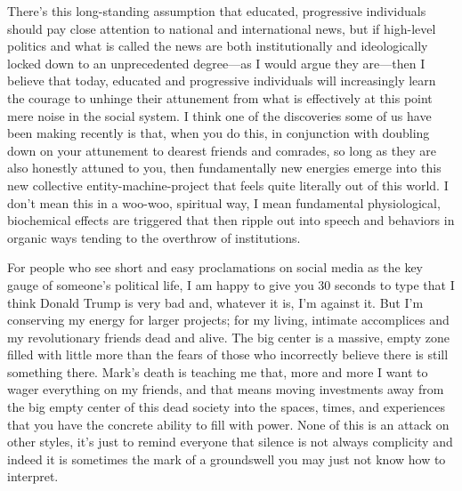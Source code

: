 \documentclass[a4paper,12pt,margin=.5in]{article}
\begin{document}
There's this long-standing assumption that educated, progressive
individuals should pay close attention to national and international
news, but if high-level politics and what is called the news are both
institutionally and ideologically locked down to an unprecedented
degree---as I would argue they are---then I believe that today, educated
and progressive individuals will increasingly learn the courage to
unhinge their attunement from what is effectively at this point mere
noise in the social system. I think one of the discoveries some of us
have been making recently is that, when you do this, in conjunction with
doubling down on your attunement to dearest friends and comrades, so
long as they are also honestly attuned to you, then fundamentally new
energies emerge into this new collective entity-machine-project that
feels quite literally out of this world. I don't mean this in a woo-woo,
spiritual way, I mean fundamental physiological, biochemical effects are
triggered that then ripple out into speech and behaviors in organic ways
tending to the overthrow of institutions.

For people who see short and easy proclamations on social media as the
key gauge of someone's political life, I am happy to give you 30 seconds
to type that I think Donald Trump is very bad and, whatever it is, I'm
against it. But I'm conserving my energy for larger projects; for my
living, intimate accomplices and my revolutionary friends dead and
alive. The big center is a massive, empty zone filled with little more
than the fears of those who incorrectly believe there is still something
there. Mark's death is teaching me that, more and more I want to wager
everything on my friends, and that means moving investments away from
the big empty center of this dead society into the spaces, times, and
experiences that you have the concrete ability to fill with power. None
of this is an attack on other styles, it's just to remind everyone that
silence is not always complicity and indeed it is sometimes the mark of
a groundswell you may just not know how to interpret.
\end{document}
